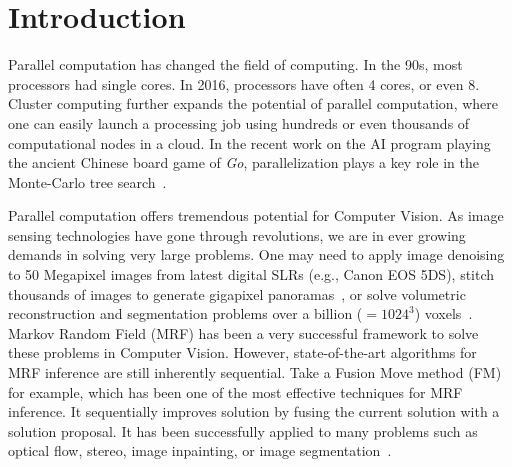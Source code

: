 \section{Introduction}

Parallel computation has changed the field of computing.  In the 90s,
most processors had single cores. In 2016, processors have often 4 cores,
or even 8. Cluster computing further expands the potential
of parallel computation, where one can easily launch a processing job
using hundreds or even thousands of computational nodes in a cloud.
%
In the recent work on the AI program playing the ancient Chinese board
game of {\it Go}, parallelization plays a key role in the Monte-Carlo
tree search~\cite{silver2016mastering}.


Parallel computation offers tremendous potential for Computer Vision. As
image sensing technologies have gone through revolutions, we are in
ever growing demands in solving very large problems. One may need to
apply image denoising to 50 Megapixel images from latest digital
SLRs (e.g., Canon EOS 5DS), stitch thousands of images to generate gigapixel
panoramas~\cite{kopf2007capturing}, or solve volumetric reconstruction and
segmentation problems over a billion ($=1024^3$)
voxels~\cite{hane2013joint}.
%
%
Markov Random Field (MRF) has been a very successful framework to solve
these problems in Computer Vision. However, state-of-the-art algorithms
for MRF inference are still inherently sequential. Take a Fusion Move
method
(FM)~\cite{fusion_flow,fusion_moves_for_markov_random_field_optimization,second_order_stereo}
for example, which has been one of the most effective techniques for MRF
inference. It sequentially improves solution by fusing the current
solution with a solution proposal. It has been successfully applied to
many problems such as optical flow, stereo, image inpainting, or image
segmentation~\cite{fusion_moves_for_markov_random_field_optimization}.


